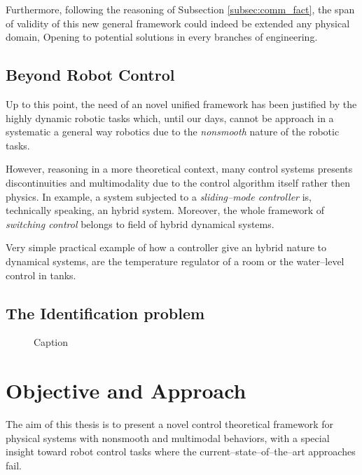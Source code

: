 Furthermore, following the reasoning of Subsection \ref{subsec:comm_fact}, the span of validity of this new general framework could indeed be extended any physical domain, Opening to potential solutions in every branches of engineering.
\subsection{Beyond Robot Control}
Up to this point, the need of an novel unified framework has been justified by the highly dynamic robotic tasks which, until our days, cannot be approach in a systematic a general way robotics due to the \textit{nonsmooth} nature of the robotic tasks.
%
\newline

%
However, reasoning in a more theoretical context, many control systems presents discontinuities and multimodality due to the control algorithm itself rather then physics. 
In example, a system subjected to a \textit{sliding--mode controller} \cite{pisano2011sliding} is, technically speaking, an hybrid system. Moreover, the whole framework of \textit{switching control} belongs to field of hybrid dynamical systems.
%
\newline

%
Very simple practical example of how a controller give an hybrid nature to dynamical systems, are the temperature regulator of a room or the water--level control in tanks.

\subsection{The Identification problem}

\begin{figure}
    \centering
    
    \caption{Caption}
    \label{fig:my_label}
\end{figure}
\clearpage

\section{{Objective and Approach}}
The aim of this thesis is to present a novel control theoretical framework for physical systems with nonsmooth and multimodal behaviors, with a special insight toward robot control tasks where the current--state--of--the--art approaches fail.

